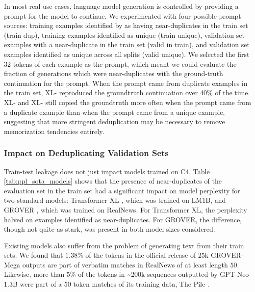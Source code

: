 In most real use cases, language model generation is controlled by providing a prompt for the model to continue.
We experimented with four possible prompt sources: training examples identified by \Exact{} as having near-duplicates in the train set (train dup), training examples identified as unique (train unique), validation set examples with a near-duplicate in the train set (valid in train), and validation set examples identified as unique across all splits (valid unique).
We selected the first 32 tokens of each example as the prompt, which meant we could evaluate the fraction of generations which were near-duplicates with the ground-truth continuation for the prompt.
When the prompt came from duplicate examples in the train set, XL-\Original{} reproduced the groundtruth continuation over 40\% of the time.
XL-\Exact{} and XL-\Approx{} still copied the groundtruth more often when the prompt came from a duplicate example than when the prompt came from a unique example, suggesting that more stringent deduplication may be necessary to remove memorization tendencies entirely. 



\subsubsection{Impact on Deduplicating Validation Sets} \label{sec:eval-existing-models}
Train-test leakage does not just impact models trained on C4.
Table \ref{tab:ppl_sota_models} shows that
the presence of near-duplicates of the evaluation set
in the train set had a significant impact on model perplexity for two standard models: Transformer-XL \citep{dai2019transformer}, which was trained on LM1B, and GROVER \citep{zellers2019defending}, which was trained on RealNews.
For Transformer XL, the perplexity halved on examples identified as near-duplicates.
For GROVER, the difference, though not quite as stark, was present in both model sizes considered.

Existing models also suffer from the problem of generating text from their train sets.
We found that $1.38\%$ of the tokens in the official release of 25k GROVER-Mega outputs
are part of verbatim matches in RealNews of at least length $50$.
Likewise, more than 5\% of the tokens in \textasciitilde 200k sequences outputted by GPT-Neo 1.3B \citep{gpt-neo} were part of a $50$ token matches of its training data, The Pile \citep{pile}.

